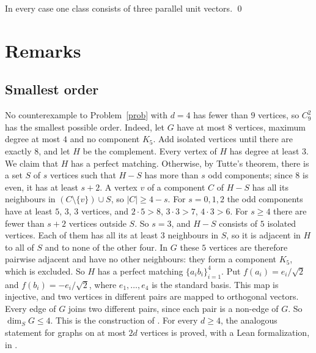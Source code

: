 \documentclass[11pt]{amsart}
\theoremstyle{definition}
\theoremstyle{remark}
\begin{document}
In every case one class consists of three parallel unit vectors. \qed

\section{Remarks}\label{sec:remarks}

\subsection*{Smallest order}
No counterexample to Problem~\ref{prob} with $d=4$ has fewer than $9$ vertices, so $C_9^2$ has the smallest possible order.
Indeed, let $G$ have at most $8$ vertices, maximum degree at most $4$ and no component $K_5$.
Add isolated vertices until there are exactly $8$, and let $H$ be the complement.
Every vertex of $H$ has degree at least $3$.
We claim that $H$ has a perfect matching.
Otherwise, by Tutte's theorem, there is a set $S$ of $s$ vertices such that $H-S$ has more than $s$ odd components; since $8$ is even, it has at least $s+2$.
A vertex $v$ of a component $C$ of $H-S$ has all its neighbours in $(C\setminus\{v\})\cup S$, so $|C|\ge 4-s$.
For $s=0,1,2$ the odd components have at least $5$, $3$, $3$ vertices, and $2\cdot5>8$, $3\cdot3>7$, $4\cdot3>6$.
For $s\ge4$ there are fewer than $s+2$ vertices outside $S$.
So $s=3$, and $H-S$ consists of $5$ isolated vertices.
Each of them has all its at least $3$ neighbours in $S$, so it is adjacent in $H$ to all of $S$ and to none of the other four.
In $G$ these $5$ vertices are therefore pairwise adjacent and have no other neighbours: they form a component $K_5$, which is excluded.
So $H$ has a perfect matching $\{a_ib_i\}_{i=1}^4$.
Put $f(a_i)=e_i/\sqrt2$ and $f(b_i)=-e_i/\sqrt2$, where $e_1,\dots,e_4$ is the standard basis.
This map is injective, and two vertices in different pairs are mapped to orthogonal vectors.
Every edge of $G$ joins two different pairs, since each pair is a non-edge of $G$.
So $\dim_S G\le4$.
This is the construction of \cite[Lemma~13]{FKS}.
For every $d\ge4$, the analogous statement for graphs on at most $2d$ vertices is proved, with a Lean formalization, in \cite{Dishant}.
\end{document}
